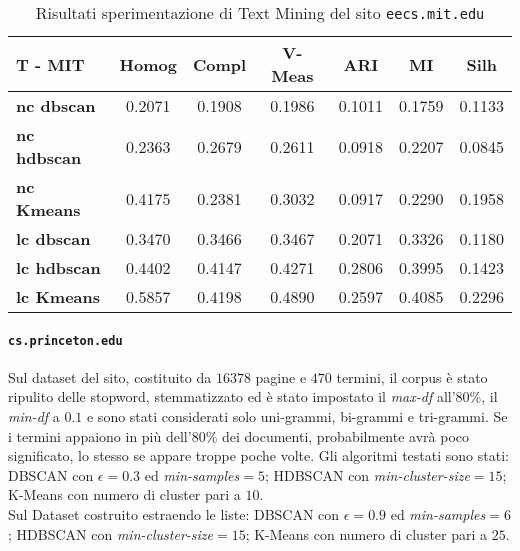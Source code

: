 \begin{table}[H]
	\begin{tabular}{| l | c | c | c | c | c | c |}
	\hline
	\textbf{T - MIT}  & \textbf{Homog} & \textbf{Compl} & \textbf{V-Meas}  & \textbf{ARI}  & \textbf{MI}  & \textbf{Silh} \\ [3ex] \hline
	\textbf{nc dbscan} & 0.2071 & 0.1908 & 0.1986 & 0.1011 & 0.1759 & 0.1133\\ [3ex]
	 \hline 
	\textbf{nc hdbscan} & 0.2363 & 0.2679 & 0.2611 & 0.0918 & 0.2207 & 0.0845\\ [3ex]
	 \hline
	\textbf{nc Kmeans} & 0.4175 & 0.2381 & 0.3032 & 0.0917 & 0.2290 & 0.1958\\ [3ex]
	 \hline	
	\textbf{lc dbscan} & 0.3470 & 0.3466 & 0.3467 & 0.2071 & 0.3326 & 0.1180\\ [3ex]
	\hline
	\textbf{lc hdbscan} & 0.4402 & 0.4147 & 0.4271 & 0.2806 & 0.3995 & 0.1423\\ [3ex]
	\hline
	\textbf{lc Kmeans} & 0.5857 & 0.4198 & 0.4890 & 0.2597 & 0.4085 & 0.2296\\ [3ex]
	\hline
	\end{tabular}
	\caption{Risultati sperimentazione di Text Mining del sito \texttt{eecs.mit.edu}}
	\label{metricheTextMit}
\end{table}

\paragraph{\texttt{cs.princeton.edu}}
Sul dataset del sito, costituito da $16378$ pagine e $470$ termini, il corpus è stato ripulito delle stopword, stemmatizzato ed è stato impostato il \textit{max-df} all'80\%, il \textit{min-df} a $0.1$ e sono stati considerati solo uni-grammi, bi-grammi e tri-grammi. Se i termini appaiono in più dell'80\% dei documenti, probabilmente avrà poco significato, lo stesso se appare troppe poche volte. Gli algoritmi testati sono stati: DBSCAN con $\epsilon = 0.3$ ed \textit{min-samples}$ = 5$; HDBSCAN con \textit{min-cluster-size}$=15$; K-Means con numero di cluster pari a $10$. \\Sul Dataset costruito estraendo le liste: DBSCAN con $\epsilon = 0.9$ ed \textit{min-samples}$ = 6$; HDBSCAN con \textit{min-cluster-size}$=15$; K-Means con numero di cluster pari a $25$.  

